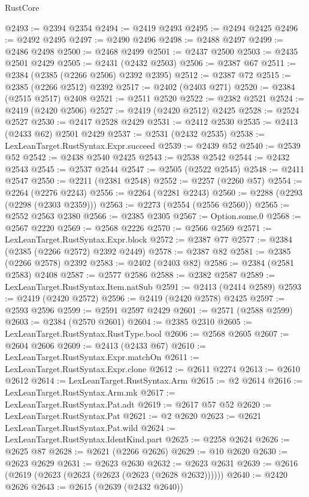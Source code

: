 \begin{lexlean}{RustCore}
\begin{coremodule}
@2493 := @2394 @2354
@2494 := @2419 @2493
@2495 := @2494 @2425
@2496 := @2492 @2495
@2497 := @2490 @2496
@2498 := @2488 @2497
@2499 := @2486 @2498
@2500 := @2468 @2499
@2501 := @2437 @2500
@2503 := @2435 @2501 @2429
@2505 := @2431 (@2432 @2503)
@2506 := @2387 @67
@2511 := @2384 (@2385 (@2266 @2506) @2392 @2395)
@2512 := @2387 @72
@2515 := @2385 (@2266 @2512) @2392
@2517 := @2402 (@2403 @271)
@2520 := @2384 (@2515 @2517) @2408
@2521 := @2511 @2520
@2522 := @2382 @2521
@2524 := @2419 (@2420 @2506)
@2527 := @2419 (@2420 @2512) @2425
@2528 := @2524 @2527
@2530 := @2417 @2528 @2429
@2531 := @2412 @2530
@2535 := @2413 (@2433 @62) @2501 @2429
@2537 := @2531 (@2432 @2535)
@2538 := LexLeanTarget.RustSyntax.Expr.succeed
@2539 := @2439 @52
@2540 := @2539 @52
@2542 := @2438 @2540 @2425
@2543 := @2538 @2542
@2544 := @2432 @2543
@2545 := @2537 @2544
@2547 := @2505 (@2522 @2545)
@2548 := @2411 @2547
@2550 := @2211 (@2381 @2548)
@2552 := @2257 (@2260 @57)
@2554 := @2264 (@2276 @2243)
@2556 := @2264 (@2281 @2243)
@2560 := @2288 (@2293 (@2298 (@2303 @2359)))
@2563 := @2273 (@2554 (@2556 @2560))
@2565 := @2552 @2563 @2380
@2566 := @2385 @2305
@2567 := Option.some.{0}
@2568 := @2567 @2220
@2569 := @2568 @2226
@2570 := @2566 @2569
@2571 := LexLeanTarget.RustSyntax.Expr.block
@2572 := @2387 @77
@2577 := @2384 (@2385 (@2266 @2572) @2392 @2449)
@2578 := @2387 @82
@2581 := @2385 (@2266 @2578) @2392
@2583 := @2402 (@2403 @82)
@2586 := @2384 (@2581 @2583) @2408
@2587 := @2577 @2586
@2588 := @2382 @2587
@2589 := LexLeanTarget.RustSyntax.Item.natSub
@2591 := @2413 (@2414 @2589)
@2593 := @2419 (@2420 @2572)
@2596 := @2419 (@2420 @2578) @2425
@2597 := @2593 @2596
@2599 := @2591 @2597 @2429
@2601 := @2571 (@2588 @2599)
@2603 := @2384 (@2570 @2601)
@2604 := @2385 @2310
@2605 := LexLeanTarget.RustSyntax.RustType.bool
@2606 := @2568 @2605
@2607 := @2604 @2606
@2609 := @2413 (@2433 @67)
@2610 := LexLeanTarget.RustSyntax.Expr.matchOn
@2611 := LexLeanTarget.RustSyntax.Expr.clone
@2612 := @2611 @2274
@2613 := @2610 @2612
@2614 := LexLeanTarget.RustSyntax.Arm
@2615 := @2 @2614
@2616 := LexLeanTarget.RustSyntax.Arm.mk
@2617 := LexLeanTarget.RustSyntax.Pat.adt
@2619 := @2617 @57 @52
@2620 := LexLeanTarget.RustSyntax.Pat
@2621 := @2 @2620
@2623 := @2621 LexLeanTarget.RustSyntax.Pat.wild
@2624 := LexLeanTarget.RustSyntax.IdentKind.part
@2625 := @2258 @2624
@2626 := @2625 @87
@2628 := @2621 (@2266 @2626)
@2629 := @10 @2620
@2630 := @2623 @2629
@2631 := @2623 @2630
@2632 := @2623 @2631
@2639 := @2616 (@2619 (@2623 (@2623 (@2623 (@2623 (@2628 @2632))))))
@2640 := @2420 @2626
@2643 := @2615 (@2639 (@2432 @2640))

\end{coremodule}
\end{lexlean}
